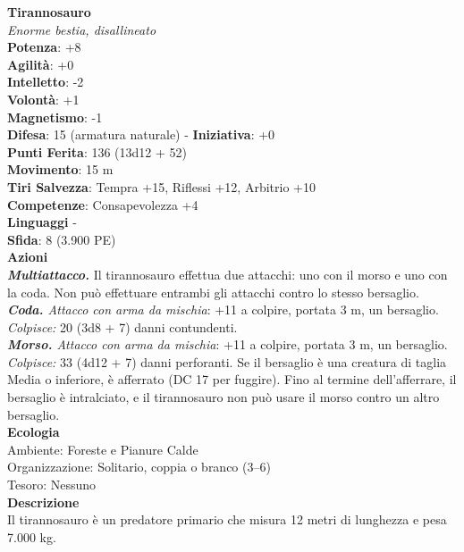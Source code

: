 \begin{multicols}{2}
\medskip\textbf{Tirannosauro}\\
\emph{Enorme bestia, disallineato}\\
\textbf{Potenza}: +8\\
\textbf{Agilità}: +0\\
\textbf{Intelletto}: -2\\
\textbf{Volontà}: +1\\
\textbf{Magnetismo}: -1\\
\textbf{Difesa}: 15 (armatura naturale) - \textbf{Iniziativa}: +0\\
\textbf{Punti Ferita}: 136 (13d12 + 52)\\
\textbf{Movimento}: 15 m\\
\textbf{Tiri Salvezza}: Tempra +15, Riflessi +12, Arbitrio +10\\
\textbf{Competenze}: Consapevolezza +4\\
\textbf{Linguaggi} -\\
\textbf{Sfida}: 8 (3.900 PE)\smallskip\\
\smallskip\textbf{Azioni}\\
\emph{\textbf{Multiattacco.}} Il tirannosauro effettua due attacchi: uno con il morso e uno con la coda. Non può effettuare entrambi gli attacchi contro lo stesso bersaglio. \\
\emph{\textbf{Coda.} Attacco con arma da mischia}: +11 a colpire, portata 3 m, un bersaglio.\\
\emph{Colpisce:} 20 (3d8 + 7) danni contundenti.\\
\emph{\textbf{Morso.} Attacco con arma da mischia}: +11 a colpire, portata 3 m, un bersaglio.\\
\emph{Colpisce:} 33 (4d12 + 7) danni perforanti. Se il bersaglio è una creatura di taglia Media o inferiore, è afferrato (DC 17 per fuggire). Fino al termine dell'afferrare, il bersaglio è intralciato, e il tirannosauro non può usare il morso contro un altro bersaglio.\\
\textbf{Ecologia}\\
Ambiente: Foreste e Pianure Calde\\
Organizzazione: Solitario, coppia o branco (3–6)\\
Tesoro: Nessuno\\
\textbf{Descrizione}\\
Il tirannosauro è un predatore primario che misura 12 metri di lunghezza e pesa 7.000 kg.\\


\end{multicols}
